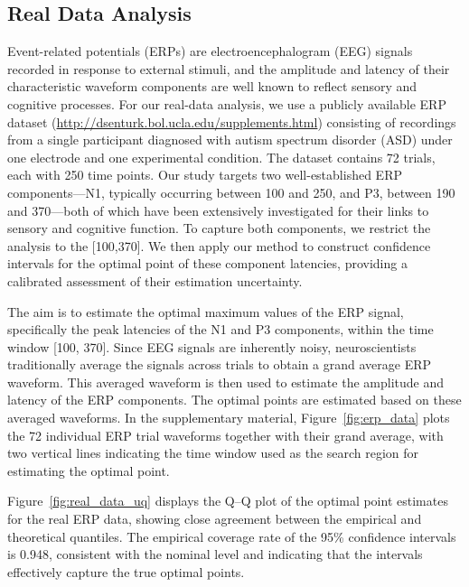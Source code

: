 \documentclass[12pt]{article}
\theoremstyle{plain}
\theoremstyle{remark}
\begin{document}
\subsection{Real Data Analysis}\label{subsec:data}






Event-related potentials (ERPs) are electroencephalogram (EEG) signals recorded in response to external stimuli, and the amplitude and latency of their characteristic waveform components are well known to reflect sensory and cognitive processes. For our real-data analysis, we use a publicly available ERP dataset (\url{http://dsenturk.bol.ucla.edu/supplements.html}) consisting of recordings from a single participant diagnosed with autism spectrum disorder (ASD) under one electrode and one experimental condition. The dataset contains 72 trials, each with 250 time points. Our study targets two well-established ERP components—N1, typically occurring between 100 and 250, and P3, between 190 and 370—both of which have been extensively investigated for their links to sensory and cognitive function. To capture both components, we restrict the analysis to the [100,370]. We then apply our method to construct confidence intervals for the optimal point of these component latencies, providing a calibrated assessment of their estimation uncertainty.



The aim is to estimate the optimal maximum values of the ERP signal, specifically the peak latencies of the N1 and P3 components, within the time window [100, 370]. Since EEG signals are inherently noisy, neuroscientists traditionally average the signals across trials to obtain a grand average ERP waveform. This averaged waveform is then used to estimate the amplitude and latency of the ERP components. The optimal points are estimated based on these averaged waveforms. In the supplementary material, Figure~\ref{fig:erp_data} plots the 72 individual ERP trial waveforms together with their grand average, with two vertical lines indicating the time window used as the search region for estimating the optimal point.


Figure~\ref{fig:real_data_uq} displays the Q–Q plot of the optimal point estimates for the real ERP data, showing close agreement between the empirical and theoretical quantiles. The empirical coverage rate of the 95\% confidence intervals is 0.948, consistent with the nominal level and indicating that the intervals effectively capture the true optimal points.
\end{document}
